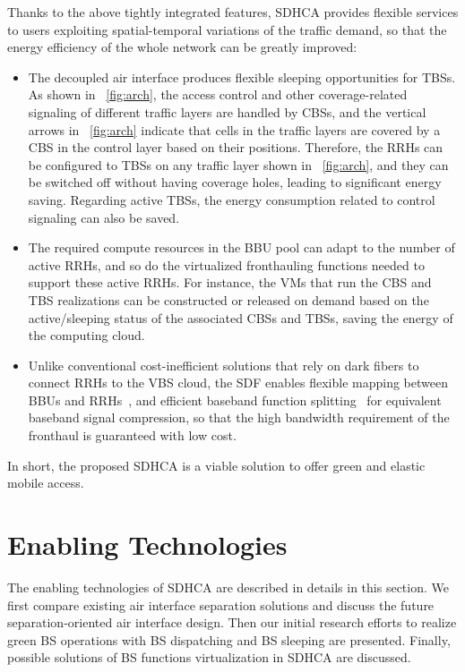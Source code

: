 \documentclass[12pt, draftclsnofoot,onecolumn]{IEEEtran}
\begin{document}
Thanks to the above tightly integrated features, SDHCA provides flexible services to users exploiting spatial-temporal variations of the traffic demand, so that the energy efficiency of the whole network can be greatly improved:
\begin{itemize}
\item The decoupled air interface produces flexible sleeping opportunities for TBSs. As shown in \figurename~\ref{fig:arch}, the access control and other coverage-related
signaling of different traffic layers are handled by CBSs, and the vertical
arrows in \figurename~\ref{fig:arch} indicate that cells in the traffic layers are covered by
a CBS in the control layer based on their positions. Therefore, the RRHs can
be configured to TBSs on any traffic layer shown in \figurename~\ref{fig:arch}, and they can be switched off without having coverage holes, leading to significant energy saving. Regarding active TBSs, the energy consumption related to control signaling can also be saved.
\item The required compute resources in the BBU pool can adapt to the number of active RRHs, and so do the virtualized fronthauling functions needed to support these active RRHs. For instance, the VMs that run the CBS and TBS realizations can be constructed or released on demand based on the active/sleeping status of the associated CBSs and TBSs, saving the energy of the computing cloud.
\item Unlike conventional cost-inefficient solutions that rely on dark fibers to connect RRHs to the VBS cloud, the SDF enables flexible mapping between BBUs and RRHs~\cite{arslan2015software}, and efficient baseband function splitting~\cite{liu2015graph} for equivalent baseband signal compression, so that the high bandwidth requirement of the fronthaul is guaranteed with low cost.
\end{itemize}
In short, the proposed SDHCA is a viable solution to offer green and elastic mobile access.

\section{Enabling Technologies}
\label{sec:key}

The enabling technologies of SDHCA are described in details in this section. We first compare existing air interface separation solutions and discuss the future separation-oriented air interface design. Then our initial research efforts to realize green BS operations with BS dispatching and BS sleeping are presented. Finally, possible solutions of BS functions virtualization in SDHCA are discussed.
\end{document}
